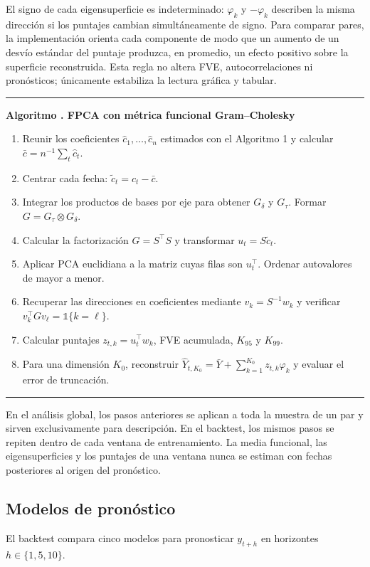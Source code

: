 \documentclass[a4paper,11pt]{article}
\newcounter{algoritmotesis}
\newenvironment{algoritmotesis}[1]{%
  \refstepcounter{algoritmotesis}%
  \par\medskip
  \noindent\begin{minipage}{\linewidth}
  \hrule\vspace{0.6em}
  \textbf{Algoritmo \thealgoritmotesis. #1}
  \begin{enumerate}
}{%
  \end{enumerate}
  \vspace{0.2em}\hrule
  \end{minipage}
  \par\medskip
}
\begin{document}
El signo de cada eigensuperficie es indeterminado: \(\varphi_k\) y \(-\varphi_k\) describen la misma dirección si los puntajes cambian simultáneamente de signo. Para comparar pares, la implementación orienta cada componente de modo que un aumento de un desvío estándar del puntaje produzca, en promedio, un efecto positivo sobre la superficie reconstruida. Esta regla no altera FVE, autocorrelaciones ni pronósticos; únicamente estabiliza la lectura gráfica y tabular.

\begin{algoritmotesis}{FPCA con métrica funcional Gram--Cholesky}
  \item Reunir los coeficientes \(\widehat c_1,\ldots,\widehat c_n\) estimados con el Algoritmo 1 y calcular \(\bar c=n^{-1}\sum_t\widehat c_t\).
  \item Centrar cada fecha: \(\widetilde c_t=\widehat c_t-\bar c\).
  \item Integrar los productos de bases por eje para obtener \(G_\delta\) y \(G_\tau\). Formar \(G=G_\tau\otimes G_\delta\).
  \item Calcular la factorización \(G=S^\top S\) y transformar \(u_t=S\widetilde c_t\).
  \item Aplicar PCA euclidiana a la matriz cuyas filas son \(u_t^\top\). Ordenar autovalores de mayor a menor.
  \item Recuperar las direcciones en coeficientes mediante \(v_k=S^{-1}w_k\) y verificar \(v_k^\top Gv_\ell=\mathbb 1\{k=\ell\}\).
  \item Calcular puntajes \(z_{t,k}=u_t^\top w_k\), FVE acumulada, \(K_{95}\) y \(K_{99}\).
  \item Para una dimensión \(K_0\), reconstruir \(\widehat Y_{t,K_0}=\bar Y+\sum_{k=1}^{K_0}z_{t,k}\varphi_k\) y evaluar el error de truncación.
\end{algoritmotesis}

En el análisis global, los pasos anteriores se aplican a toda la muestra de un par y sirven exclusivamente para descripción. En el backtest, los mismos pasos se repiten dentro de cada ventana de entrenamiento. La media funcional, las eigensuperficies y los puntajes de una ventana nunca se estiman con fechas posteriores al origen del pronóstico.

\subsection{Modelos de pronóstico}

El backtest compara cinco modelos para pronosticar \(y_{t+h}\) en horizontes \(h\in\{1,5,10\}\).
\end{document}
